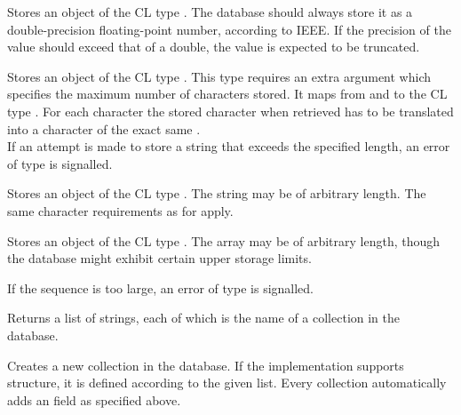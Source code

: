 Stores an object of the CL type . The database should always store it as a double-precision floating-point number, according to IEEE. If the precision of the value should exceed that of a double, the value is expected to be truncated.

Stores an object of the CL type . This type requires an extra argument which specifies the maximum number of characters stored. It maps from and to the CL type . For each character the stored character when retrieved has to be translated into a character of the exact same . \\

\noindent If an attempt is made to store a string that exceeds the specified length, an error of type  is signalled.

Stores an object of the CL type . The string may be of arbitrary length. The same character requirements as for  apply.

Stores an object of the CL type . The array may be of arbitrary length, though the database might exhibit certain upper storage limits.

\noindent If the sequence is too large, an error of type  is signalled.

Returns a list of strings, each of which is the name of a collection in the database.

Creates a new collection in the database. If the implementation supports structure, it is defined according to the given  list. Every collection automatically adds an  field as specified above. \\

